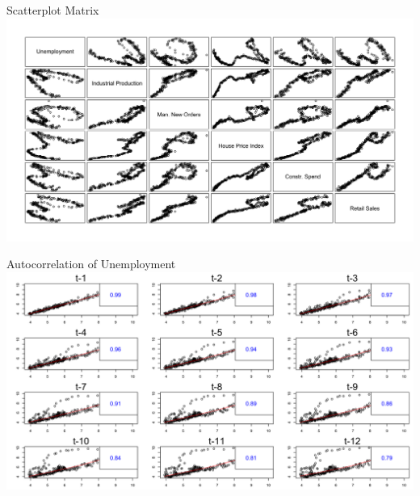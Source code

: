 \documentclass[ignorenonframetext]{beamer}
\begin{document}
\begin{frame}{Scatterplot Matrix}
		\includegraphics[width=\linewidth]{images/pred_scatt}
\end{frame}
\begin{frame}{Autocorrelation of Unemployment}
		\includegraphics[width=\linewidth]{images/laggedunemployment}
\end{frame}
 
\end{document}
